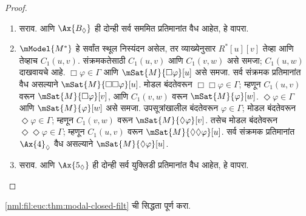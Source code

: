 \begin{proof}
\begin{enumerate}
  \item सराव.  आणि $\Ax{B_\Diamond}$ ही दोन्ही
    सर्व सममित प्रतिमानांत वैध आहेत, हे वापरा.
  \item $\mModel{M^*}$ हे सर्वांत स्थूल निस्यंदन असेल,
    तर व्याख्येनुसार $R^*[u][v]$ तेव्हा आणि तेव्हाच
    $C_1(u,v)$. संक्रमकतेसाठी $C_1(u,v)$ आणि
    $C_1(v,w)$ असे समजा; $C_1(u,w)$ दाखवायचे आहे.
    $\Box\varphi\in\Gamma$ आणि
      $\mSat{M}{\Box \varphi}[u]$ असे समजा.
      सर्व संक्रमक प्रतिमानांत  वैध असल्याने
      $\mSat{M}{\Box\Box\varphi}[u]$. मोडल बंदतेवरून
      $\Box\Box\varphi \in \Gamma$; म्हणून $C_1(u,v)$ वरून
      $\mSat{M}{\Box\varphi}[v]$, आणि $C_1(v,w)$ वरून
      $\mSat{M}{\varphi}[w]$.
      $\Diamond\varphi\in\Gamma$ आणि $\mSat{M}{\varphi}[w]$ असे समजा.
      उपसूत्रांखालील बंदतेवरून $\varphi\in\Gamma$; मोडल बंदतेवरून
      $\Diamond \varphi \in \Gamma$; म्हणून $C_1(v,w)$ वरून
      $\mSat{M}{\Diamond \varphi}[v]$. तसेच मोडल बंदतेवरून
      $\Diamond\Diamond\varphi \in \Gamma$; म्हणून $C_1(u,v)$ वरून
      $\mSat{M}{\Diamond\Diamond \varphi}[u]$.
      सर्व संक्रमक प्रतिमानांत $\Ax{4}_\Diamond$
      वैध असल्याने $\mSat{M}{\Diamond\varphi}[u]$.
  \item सराव.  आणि $\Ax{5_\Diamond}$ ही दोन्ही
    सर्व युक्लिडी प्रतिमानांत वैध आहेत, हे वापरा.
\end{enumerate}
\end{proof}

\begin{prob}
  \ref{nml:fil:euc:thm:modal-closed-filt} ची सिद्धता पूर्ण करा.
\end{prob}




